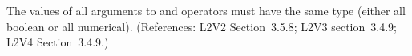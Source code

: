 The values of all arguments to  and  operators must
have the same type (either all boolean or all numerical).
(References: L2V2 Section~3.5.8; L2V3 section~3.4.9; L2V4 Section~3.4.9.)
